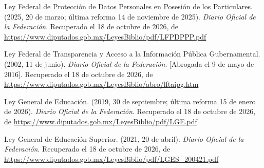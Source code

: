 \documentclass[12pt, a4paper]{article}
\begin{document}
\begin{list}{}{\setlength{\leftmargin}{1.27cm}\setlength{\itemindent}{-1.27cm}%
  \setlength{\labelwidth}{0pt}\setlength{\labelsep}{0pt}\setlength{\itemsep}{6pt}}
\item Ley Federal de Protección de Datos Personales en Posesión
  de los Particulares. (2025, 20 de marzo; última reforma 14 de
  noviembre de 2025). \textit{Diario Oficial de la Federación}. Recuperado el 18 de octubre de 2026, de \url{https://www.diputados.gob.mx/LeyesBiblio/pdf/LFPDPPP.pdf}


\item Ley Federal de Transparencia y Acceso a la Información
  Pública Gubernamental. (2002, 11 de junio). \textit{Diario
  Oficial de la Federación}. [Abrogada el 9 de mayo de 2016]. Recuperado el 18 de octubre de 2026, de \url{https://www.diputados.gob.mx/LeyesBiblio/abro/lftaipg.htm}

\item Ley General de Educación. (2019, 30 de septiembre; última
  reforma 15 de enero de 2026). \textit{Diario Oficial de la
Federación}. Recuperado el 18 de octubre de 2026, de \url{https://www.diputados.gob.mx/LeyesBiblio/pdf/LGE.pdf}
 
 
\item Ley General de Educación Superior. (2021, 20 de abril).
  \textit{Diario Oficial de la Federación}. Recuperado el 18 de octubre de 2026, de \url{https://www.diputados.gob.mx/LeyesBiblio/pdf/LGES_200421.pdf}
 


\end{list}
\end{document}
